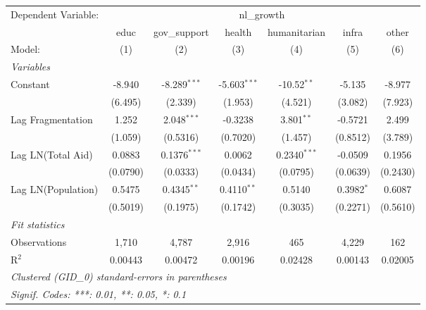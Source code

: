 \begingroup
\centering
\begin{tabular}{lcccccc}
   \tabularnewline \midrule \midrule
   Dependent Variable: & \multicolumn{6}{c}{nl\_growth}\\
                      & educ     & gov\_support   & health         & humanitarian   & infra        & other \\   
   Model:             & (1)      & (2)            & (3)            & (4)            & (5)          & (6)\\  
   \midrule
   \emph{Variables}\\
   Constant           & -8.940   & -8.289$^{***}$ & -5.603$^{***}$ & -10.52$^{**}$  & -5.135       & -8.977\\   
                      & (6.495)  & (2.339)        & (1.953)        & (4.521)        & (3.082)      & (7.923)\\   
   Lag Fragmentation  & 1.252    & 2.048$^{***}$  & -0.3238        & 3.801$^{**}$   & -0.5721      & 2.499\\   
                      & (1.059)  & (0.5316)       & (0.7020)       & (1.457)        & (0.8512)     & (3.789)\\   
   Lag LN(Total Aid)  & 0.0883   & 0.1376$^{***}$ & 0.0062         & 0.2340$^{***}$ & -0.0509      & 0.1956\\   
                      & (0.0790) & (0.0333)       & (0.0434)       & (0.0795)       & (0.0639)     & (0.2430)\\   
   Lag LN(Population) & 0.5475   & 0.4345$^{**}$  & 0.4110$^{**}$  & 0.5140         & 0.3982$^{*}$ & 0.6087\\   
                      & (0.5019) & (0.1975)       & (0.1742)       & (0.3035)       & (0.2271)     & (0.5610)\\   
   \midrule
   \emph{Fit statistics}\\
   Observations       & 1,710    & 4,787          & 2,916          & 465            & 4,229        & 162\\  
   R$^2$              & 0.00443  & 0.00472        & 0.00196        & 0.02428        & 0.00143      & 0.02005\\  
   \midrule \midrule
   \multicolumn{7}{l}{\emph{Clustered (GID\_0) standard-errors in parentheses}}\\
   \multicolumn{7}{l}{\emph{Signif. Codes: ***: 0.01, **: 0.05, *: 0.1}}\\
\end{tabular}
\par\endgroup




